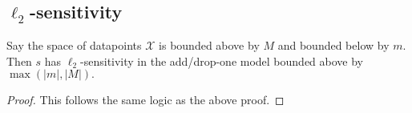 \documentclass[11pt]{scrartcl} %
\begin{document}
\subsection{$\ell_2$-sensitivity}

\begin{theorem}
Say the space of datapoints $\mathcal{X}$ is bounded above by $M$ and bounded below by $m$. Then $s$ has $\ell_2$-sensitivity in the add/drop-one model bounded above by $\max(\vert m \vert, \vert M \vert).$
\end{theorem}

\begin{proof}
This follows the same logic as the above proof.
%
%
\end{proof}

% 
% 
\end{document}
